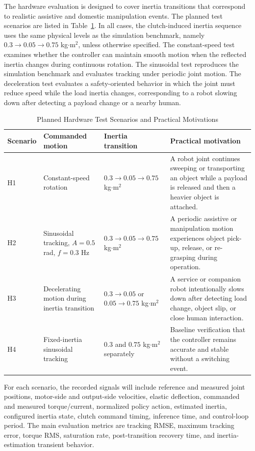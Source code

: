 \documentclass[letterpaper,journal]{IEEEtran}
\begin{document}
The hardware evaluation is designed to cover inertia transitions that correspond to realistic assistive and domestic manipulation events. The planned test scenarios are listed in Table~\ref{tab:hardware_scenarios}. In all cases, the clutch-induced inertia sequence uses the same physical levels as the simulation benchmark, namely $0.3 \rightarrow 0.05 \rightarrow 0.75$ kg$\cdot$m$^2$, unless otherwise specified. The constant-speed test examines whether the controller can maintain smooth motion when the reflected inertia changes during continuous rotation. The sinusoidal test reproduces the simulation benchmark and evaluates tracking under periodic joint motion. The deceleration test evaluates a safety-oriented behavior in which the joint must reduce speed while the load inertia changes, corresponding to a robot slowing down after detecting a payload change or a nearby human.

\begin{table}[t]
\centering
\caption{Planned Hardware Test Scenarios and Practical Motivations}
\label{tab:hardware_scenarios}
\footnotesize
\begin{tabular}{@{}p{}p{}p{}p{}@{}}
\toprule
Scenario & Commanded motion & Inertia transition & Practical motivation \\
\midrule
H1 & Constant-speed rotation & $0.3 \rightarrow 0.05 \rightarrow 0.75$ kg$\cdot$m$^2$ & A robot joint continues sweeping or transporting an object while a payload is released and then a heavier object is attached. \\
H2 & Sinusoidal tracking, $A=0.5$ rad, $f=0.3$ Hz & $0.3 \rightarrow 0.05 \rightarrow 0.75$ kg$\cdot$m$^2$ & A periodic assistive or manipulation motion experiences object pick-up, release, or re-grasping during operation. \\
H3 & Decelerating motion during inertia transition & $0.3 \rightarrow 0.05$ or $0.05 \rightarrow 0.75$ kg$\cdot$m$^2$ & A service or companion robot intentionally slows down after detecting load change, object slip, or close human interaction. \\
H4 & Fixed-inertia sinusoidal tracking & $0.3$ and $0.75$ kg$\cdot$m$^2$ separately & Baseline verification that the controller remains accurate and stable without a switching event. \\
\bottomrule
\end{tabular}
\end{table}

For each scenario, the recorded signals will include reference and measured joint positions, motor-side and output-side velocities, elastic deflection, commanded and measured torque/current, normalized policy action, estimated inertia, configured inertia state, clutch command timing, inference time, and control-loop period. The main evaluation metrics are tracking RMSE, maximum tracking error, torque RMS, saturation rate, post-transition recovery time, and inertia-estimation transient behavior.
\end{document}
